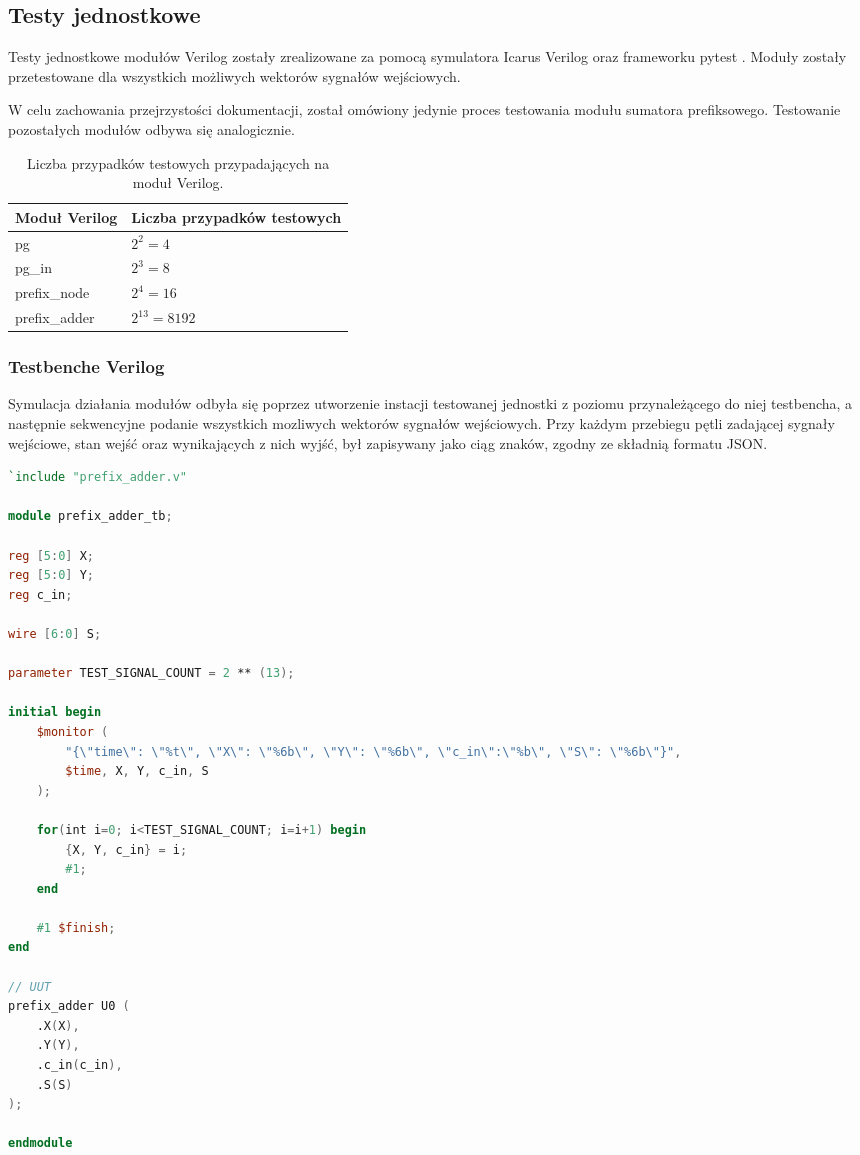 \documentclass[12pt,oneside,reqno]{article}
\begin{document}
\clearpage
\subsection{Testy jednostkowe}

Testy jednostkowe modułów Verilog zostały zrealizowane za pomocą symulatora Icarus Verilog \cite{iverilog} oraz frameworku pytest \cite{pytest}. Moduły zostały przetestowane dla wszystkich możliwych wektorów sygnałów wejściowych. 

W celu zachowania przejrzystości dokumentacji, został omówiony jedynie proces testowania modułu sumatora prefiksowego. Testowanie pozostałych modułów odbywa się analogicznie.

\begin{table}[H]
\centering
\caption{Liczba przypadków testowych przypadających na moduł Verilog.}
\begin{tabular}{l|l}
\textbf{Moduł Verilog} & \textbf{Liczba przypadków testowych} \\ \hline
pg                     & $2^2 = 4$         \\ \hline
pg\_in                 & $2^3 = 8$         \\ \hline
prefix\_node           & $2^4 = 16$        \\ \hline
prefix\_adder          & $2^{13} = 8192$    
\end{tabular}
\label{table:test-case-count-per-module}
\end{table}

\subsubsection{Testbenche Verilog}
Symulacja działania modułów odbyła się poprzez utworzenie instacji testowanej jednostki z poziomu przynależącego do niej testbencha, a następnie sekwencyjne podanie wszystkich mozliwych wektorów sygnałów wejściowych. Przy każdym przebiegu pętli zadającej sygnały wejściowe, stan wejść oraz wynikających z nich wyjść, był zapisywany jako ciąg znaków, zgodny ze składnią formatu JSON.

\begin{lstlisting}[caption={Testbench dla modułu prefix\_adder}, label={lst:tb-pg}, language=Verilog]
`include "prefix_adder.v"

module prefix_adder_tb;

reg [5:0] X;
reg [5:0] Y;
reg c_in;

wire [6:0] S;

parameter TEST_SIGNAL_COUNT = 2 ** (13);

initial begin 
    $monitor (
        "{\"time\": \"%t\", \"X\": \"%6b\", \"Y\": \"%6b\", \"c_in\":\"%b\", \"S\": \"%6b\"}", 
        $time, X, Y, c_in, S
    );

    for(int i=0; i<TEST_SIGNAL_COUNT; i=i+1) begin
        {X, Y, c_in} = i;
        #1;
    end
    
    #1 $finish;
end

// UUT
prefix_adder U0 (
    .X(X),
    .Y(Y),
    .c_in(c_in),
    .S(S)
);

endmodule
\end{lstlisting}
\end{document}
